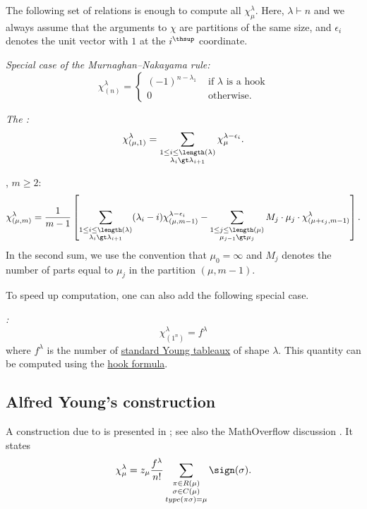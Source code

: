 The following set of relations is enough to compute all
$\chi^{\lambda}_{\mu}$.
Here, $\lambda \vdash n$ and we always assume that the arguments to $\chi$
are partitions of the same size, and $\epsilon_i$ denotes the unit vector with $1$
at the $i^\thsup$ coordinate.

\emph{Special case of the Murnaghan--Nakayama rule:}
\[
	\chi^{\lambda}_{(n)} =
	\begin{cases}
	(-1)^{n-\lambda_1} & \text{ if $\lambda$ is a hook} \\
	0 &\text{ otherwise}.
	\end{cases}
\]

\emph{The \label{jamesKerberBranchingRule}:}
\[
	\chi^{\lambda}_{(\mu,1)} =
	\sum_{\substack{ 1 \leq i \leq \length(\lambda) \\ \lambda_i \gt \lambda_{i+1} }}
		\chi^{\lambda - \epsilon_i}_{\mu}.
\]

\emph{\label{holmesCharacterRecursion}}, $m \geq 2$:
\[
	\chi^{\lambda}_{(\mu,m)} = \frac{1}{m-1} \left[
	
	\sum_{\substack{ 1 \leq i \leq \length(\lambda) \\ \lambda_i \gt \lambda_{i+1} }}
		(\lambda_i - i) \chi^{\lambda - \epsilon_i}_{(\mu,m-1)}
	-
	\sum_{\substack{ 1 \leq j \leq \length(\mu) \\ \mu_{j-1} \gt \mu_{j} }}
		M_j \cdot \mu_j \cdot \chi^{\lambda}_{(\mu+\epsilon_j,m-1)}
	\right].
\]
In the second sum, we use the convention that $\mu_0 = \infty$
and $M_j$ denotes the number of parts equal to $\mu_j$
in the partition $(\mu,m-1)$.


To speed up computation, one can also add the following special case.

\emph{\label{characterHookFormulaCase}:}
\[
	\chi^{\lambda}_{(1^n)} = f^\lambda
\]
where $f^\lambda$ is the number of
\hyperref[standardYoungTableau]{standard Young tableaux} of shape $\lambda$.
This quantity can be computed using the \hyperref[partitionCores]{hook formula}.



\subsection[youngsConstruction]{Alfred Young's construction}

A construction due to  is presented in
\cite[Thm.~1.6]{GarsiaEgecioglu2020}; see also the MathOverflow discussion
\cite{MO460613}.  It states
\[
\chi^{\lambda}_{\mu} =
z_\mu \frac{f^{\lambda}}{n!}
\sum_{\substack{\pi \in R(\mu) \\ \sigma \in C(\mu) \\ type(\pi \sigma) = \mu }} \sign(\sigma).
\]


